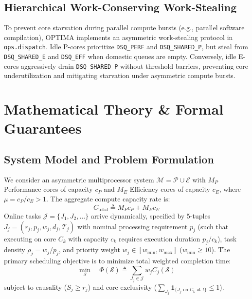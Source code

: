 \documentclass[letterpaper,twocolumn,10pt]{article}
\begin{document}
\subsection{Hierarchical Work-Conserving Work-Stealing}
To prevent core starvation during parallel compute bursts (e.g., parallel software compilation), OPTIMA implements an asymmetric work-stealing protocol in \texttt{ops.dispatch}. Idle P-cores prioritize \texttt{DSQ\_PERF} and \texttt{DSQ\_SHARED\_P}, but steal from \texttt{DSQ\_SHARED\_E} and \texttt{DSQ\_EFF} when domestic queues are empty. Conversely, idle E-cores aggressively drain \texttt{DSQ\_SHARED\_P} without threshold barriers, preventing core underutilization and mitigating starvation under asymmetric compute bursts.

\section{Mathematical Theory \& Formal Guarantees}
\label{sec:theory}

\subsection{System Model and Problem Formulation}
We consider an asymmetric multiprocessor system $\mathcal{M} = \mathcal{P} \cup \mathcal{E}$ with $M_P$ Performance cores of capacity $c_P$ and $M_E$ Efficiency cores of capacity $c_E$, where $\mu = c_P / c_E > 1$. The aggregate compute capacity rate is:
\begin{equation}
C_{\mathrm{total}} \triangleq M_P c_P + M_E c_E
\end{equation}
Online tasks $\mathcal{J} = \{J_1, J_2, \dots\}$ arrive dynamically, specified by 5-tuples $J_j = (r_j, p_j, w_j, d_j, \mathcal{T}_j)$ with nominal processing requirement $p_j$ (such that executing on core $C_k$ with capacity $c_k$ requires execution duration $p_j / c_k$), task density $\rho_j = w_j / p_j$, and priority weight $w_j \in [w_{\min}, w_{\max}]$ ($w_{\min} \ge 10$). The primary scheduling objective is to minimize total weighted completion time:
\begin{equation}
\min_{\mathcal{S}} \quad \Phi(\mathcal{S}) \triangleq \sum_{J_j \in \mathcal{J}} w_j C_j(\mathcal{S})
\end{equation}
subject to causality ($S_j \ge r_j$) and core exclusivity ($\sum_{J_j} \mathbf{1}_{\{J_j \text{ on } C_k \text{ at } t\}} \le 1$).
\end{document}

